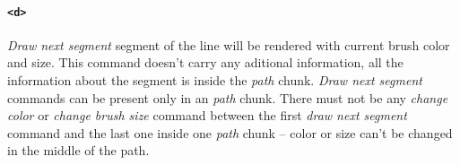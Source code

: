 \paragraph{\texttt{\textless d\textgreater}}
\textit{Draw next segment} segment of the line will be rendered with current brush color and size. This command doesn't carry any aditional information, all the information about the segment is inside the \textit{path} chunk. \textit{Draw next segment} commands can be present only in an \textit{path} chunk. There must not be any \textit{change color} or \textit{change brush size} command between the first \textit{draw next segment} command and the last one inside one \textit{path} chunk -- color or size can't be changed in the middle of the path.
